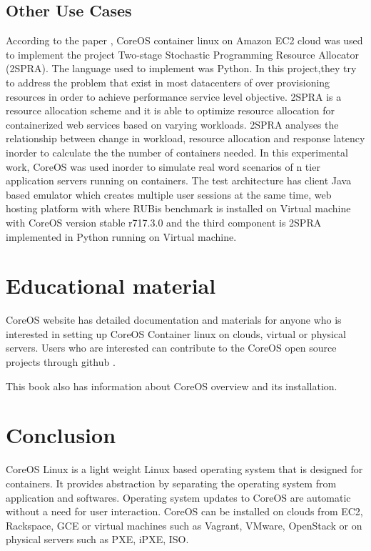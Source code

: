 \documentclass[9pt,twocolumn,twoside]{../../styles/osajnl}
\begin{document}
\subsection{Other Use Cases}
According to the paper \cite{2SPRA}, CoreOS container linux on Amazon
EC2 cloud was used to implement the project Two-stage Stochastic
Programming Resource Allocator (2SPRA). The language used to implement
was Python. In this project,they try to address the problem that exist
in most datacenters of over provisioning resources in order to achieve
performance service level objective. 2SPRA is a resource allocation
scheme and it is able to optimize resource allocation for
containerized web services based on varying workloads. 2SPRA analyses
the relationship between change in workload, resource allocation and
response latency inorder to calculate the the number of containers
needed. In this experimental work, CoreOS was used inorder to simulate
real word scenarios of n tier application servers running on
containers. The test architecture has client Java based emulator which
creates multiple user sessions at the same time, web hosting platform
with where RUBis benchmark is installed on Virtual machine with CoreOS
version stable r717.3.0 and the third component is 2SPRA implemented
in Python running on Virtual machine.


\section{Educational material} 

CoreOS website \cite{www-coreOSquickstart} has detailed documentation
and materials for anyone who is interested in setting up CoreOS
Container linux on clouds, virtual or physical servers.  Users who are
interested can contribute to the CoreOS open source projects through
github \cite {www-coregit}.

This book \cite{coreOSBook} also has information about CoreOS overview
and its installation.

\section{Conclusion} 
CoreOS Linux is a light weight Linux based operating system that is
designed for containers. It provides abstraction by separating the
operating system from application and softwares. Operating system
updates to CoreOS are automatic without a need for user
interaction. CoreOS can be installed on clouds from EC2, Rackspace,
GCE or virtual machines such as Vagrant, VMware, OpenStack or on
physical servers such as PXE, iPXE, ISO.  
\end{document}
